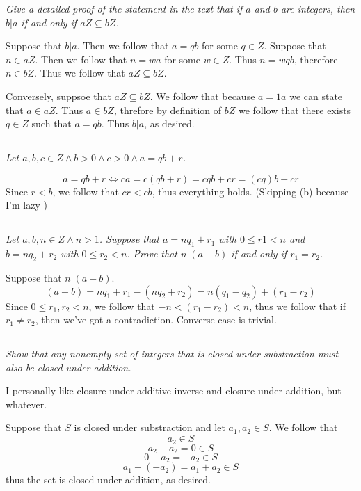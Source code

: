\documentclass[11pt,oneside,titlepage]{book}
\DeclareMathOperator \lra {\Leftrightarrow}
\begin{document}
\textit{Give a detailed proof of the statement in the text that if $a$ and $b$ are integers,
  then $b|a$ if and only if $aZ \subseteq bZ$.}

Suppose that $b|a$. Then we follow that $a = qb$ for some $q \in Z$.
Suppose that $n \in aZ$. Then we follow that $n = wa$ for some $w \in Z$. Thus
$n = wqb$, therefore $n \in bZ$. Thus we follow that $aZ \subseteq bZ$.

Conversely, suppsoe that $aZ \subseteq bZ$. We follow that because $a = 1a$ we can state that
$a \in aZ$. Thus $a \in bZ$, threfore by definition of $bZ$ we follow that there exists
$q \in Z$ such that $a = qb$. Thus $b | a$, as desired.

\subsection{}

\textit{Let $a, b, c \in Z \land b > 0 \land c > 0 \land a = qb + r$.}

$$a = qb + r \lra ca = c(qb + r) = cqb + cr = (cq)b + cr$$
Since $r < b$, we follow that $cr < cb$, thus everything holds.
(Skipping (b) because I'm lazy )


\subsection{}

\textit{Let $a, b, n \in Z \land n > 1$. Suppose that $a = nq_1 + r_1$ with $0 \leq r1 < n$
  and $b = nq_2 + r_2$ with $0 \leq r_2 < n$. Prove that $n | (a - b)$ if and only if $r_1 = r_2$.
}

Suppose that $n | (a - b)$.
$$(a - b) = n q_1 + r_1 - (nq_2 + r_2) = n(q_1 - q_2) + (r_1 - r_2)$$
Since $0 \leq r_1, r_2 < n$, we follow that $-n < (r_1 - r_2) < n$, thus we follow that
if $r_1 \neq r_2$, then we've got a contradiction. Converse case is trivial.

\subsection{}

\textit{Show that any nonempty set of integers that is closed under substraction must also
  be closed under addition.}

I personally like closure under additive inverse and closure under addition, but whatever.

Suppose that $S$ is closed under substraction and let $a_1, a_2 \in S$. We follow that
$$a_2 \in S$$
$$a_2 - a_2 = 0 \in S$$
$$0 - a_2 = -a_2 \in S$$
$$a_1 -(- a_2) = a_1 + a_2 \in S$$
thus the set is closed under addition, as desired.
\end{document}
